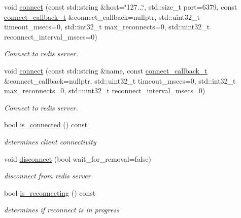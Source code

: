 \begin{DoxyCompactItemize}
void \mbox{\hyperlink{classcpp__redis_1_1subscriber_a6ae8134a9a9b31d6f2434ec4f6e86d3a}{connect}} (const std\+::string \&host=\char`\"{}127...\char`\"{}, std\+::size\+\_\+t port=6379, const \mbox{\hyperlink{classcpp__redis_1_1subscriber_a7f9e56873e5b96ad9cb2395dadae1a7a}{connect\+\_\+callback\+\_\+t}} \&connect\+\_\+callback=nullptr, std\+::uint32\+\_\+t timeout\+\_\+msecs=0, std\+::int32\+\_\+t max\+\_\+reconnects=0, std\+::uint32\+\_\+t reconnect\+\_\+interval\+\_\+msecs=0)
\begin{DoxyCompactList}\small\item\em Connect to redis server. \end{DoxyCompactList}\item 
void \mbox{\hyperlink{classcpp__redis_1_1subscriber_a8fb77a44a1e1f0d99dec639658e2aa7e}{connect}} (const std\+::string \&name, const \mbox{\hyperlink{classcpp__redis_1_1subscriber_a7f9e56873e5b96ad9cb2395dadae1a7a}{connect\+\_\+callback\+\_\+t}} \&connect\+\_\+callback=nullptr, std\+::uint32\+\_\+t timeout\+\_\+msecs=0, std\+::int32\+\_\+t max\+\_\+reconnects=0, std\+::uint32\+\_\+t reconnect\+\_\+interval\+\_\+msecs=0)
\begin{DoxyCompactList}\small\item\em Connect to redis server. \end{DoxyCompactList}\item 
bool \mbox{\hyperlink{classcpp__redis_1_1subscriber_af73acfc3c1859e6b32bc9a69856e6e59}{is\+\_\+connected}} () const
\begin{DoxyCompactList}\small\item\em determines client connectivity \end{DoxyCompactList}\item 
void \mbox{\hyperlink{classcpp__redis_1_1subscriber_aad1d0c3c6edb1522eb7b1bdb64b4705d}{disconnect}} (bool wait\+\_\+for\+\_\+removal=false)
\begin{DoxyCompactList}\small\item\em disconnect from redis server \end{DoxyCompactList}\item 
bool \mbox{\hyperlink{classcpp__redis_1_1subscriber_a8df4503f738566d2acab5f080cd44b53}{is\+\_\+reconnecting}} () const
\begin{DoxyCompactList}\small\item\em determines if reconnect is in progress \end{DoxyCompactList}\item 
\mbox{\label{classcpp__redis_1_1subscriber_ae93de179d6ea83ece59cf1a30493c3e9}} 

\end{DoxyCompactItemize}
